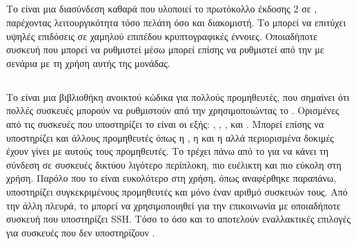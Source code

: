 \subsection{}
Το  είναι μια διασύνδεση καθαρά  που υλοποιεί το πρωτόκολλο  έκδοσης 2 σε , παρέχοντας λειτουργικότητα τόσο πελάτη όσο και διακομιστή.
Το  μπορεί να επιτύχει υψηλές επιδόσεις σε χαμηλού επιπέδου κρυπτογραφικές έννοιες.
Οποιαδήποτε συσκευή που μπορεί να ρυθμιστεί μέσω  μπορεί επίσης να ρυθμιστεί από την  με σενάρια με τη χρήση αυτής της μονάδας.

\subsection{}
Το  είναι μια βιβλιοθήκη ανοικτού κώδικα για πολλούς προμηθευτές, που σημαίνει ότι πολλές συσκευές μπορούν να ρυθμιστούν από την 
χρησιμοποιώντας το .
Ορισμένες από τις συσκευές που υποστηρίζει το  είναι οι εξής: , , ,  και . 
Μπορεί επίσης να υποστηρίζει και άλλους προμηθευτές όπως η , η  και η  αλλά περιορισμένα 
δοκιμές έχουν γίνει με αυτούς τους προμηθευτές.
Το  τρέχει πάνω από το  για να κάνει τη σύνδεση  σε συσκευές δικτύου λιγότερο περίπλοκη, πιο ευέλικτη και πιο εύκολη στη χρήση. Παρόλο που το  είναι ευκολότερο στη χρήση, όπως αναφέρθηκε 
παραπάνω, υποστηρίζει συγκεκριμένους προμηθευτές και μόνο έναν αριθμό συσκευών τους. Από την άλλη πλευρά,
το  μπορεί να χρησιμοποιηθεί για την επικοινωνία με οποιαδήποτε συσκευή που υποστηρίζει \en
{SSH}.
Τόσο το όσο και το  αποτελούν εναλλακτικές επιλογές για συσκευές που δεν υποστηρίζουν 
.

